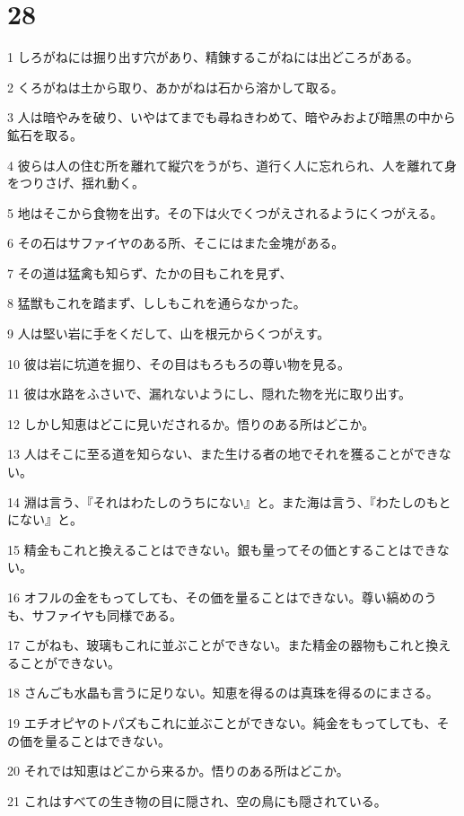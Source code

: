 \chapter{28}

\par 1 しろがねには掘り出す穴があり、精錬するこがねには出どころがある。
\par 2 くろがねは土から取り、あかがねは石から溶かして取る。
\par 3 人は暗やみを破り、いやはてまでも尋ねきわめて、暗やみおよび暗黒の中から鉱石を取る。
\par 4 彼らは人の住む所を離れて縦穴をうがち、道行く人に忘れられ、人を離れて身をつりさげ、揺れ動く。
\par 5 地はそこから食物を出す。その下は火でくつがえされるようにくつがえる。
\par 6 その石はサファイヤのある所、そこにはまた金塊がある。
\par 7 その道は猛禽も知らず、たかの目もこれを見ず、
\par 8 猛獣もこれを踏まず、ししもこれを通らなかった。
\par 9 人は堅い岩に手をくだして、山を根元からくつがえす。
\par 10 彼は岩に坑道を掘り、その目はもろもろの尊い物を見る。
\par 11 彼は水路をふさいで、漏れないようにし、隠れた物を光に取り出す。
\par 12 しかし知恵はどこに見いだされるか。悟りのある所はどこか。
\par 13 人はそこに至る道を知らない、また生ける者の地でそれを獲ることができない。
\par 14 淵は言う、『それはわたしのうちにない』と。また海は言う、『わたしのもとにない』と。
\par 15 精金もこれと換えることはできない。銀も量ってその価とすることはできない。
\par 16 オフルの金をもってしても、その価を量ることはできない。尊い縞めのうも、サファイヤも同様である。
\par 17 こがねも、玻璃もこれに並ぶことができない。また精金の器物もこれと換えることができない。
\par 18 さんごも水晶も言うに足りない。知恵を得るのは真珠を得るのにまさる。
\par 19 エチオピヤのトパズもこれに並ぶことができない。純金をもってしても、その価を量ることはできない。
\par 20 それでは知恵はどこから来るか。悟りのある所はどこか。
\par 21 これはすべての生き物の目に隠され、空の鳥にも隠されている。

